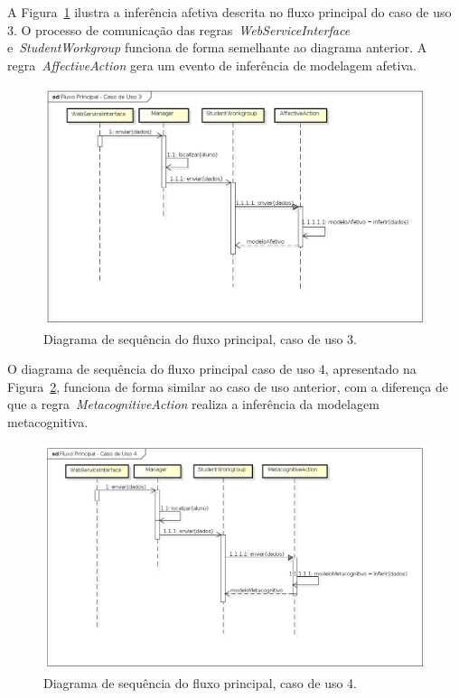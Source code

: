 A Figura~\ref{fig:dss-uc3-fluxo-principal} ilustra a inferência afetiva descrita no fluxo principal do caso de uso 3. O processo de comunicação das regras~\emph{WebServiceInterface} e~\emph{StudentWorkgroup} funciona de forma semelhante ao diagrama anterior. A regra~\emph{AffectiveAction} gera um evento de inferência de modelagem afetiva.

\begin{figure}
	\centering
	\includegraphics[scale=0.48]{images/dss-uc3-fluxo-principal.png}
	\caption{Diagrama de sequência do fluxo principal, caso de uso 3.}
	\label{fig:dss-uc3-fluxo-principal}
\end{figure}

O diagrama de sequência do fluxo principal caso de uso 4, apresentado na Figura~\ref{fig:dss-uc4-fluxo-principal}, funciona de forma similar ao caso de uso anterior, com a diferença de que a regra~\emph{MetacognitiveAction} realiza a inferência da modelagem metacognitiva.

\begin{figure}
	\centering
	\includegraphics[scale=0.48]{images/dss-uc4-fluxo-principal.png}
	\caption{Diagrama de sequência do fluxo principal, caso de uso 4.}
	\label{fig:dss-uc4-fluxo-principal}
\end{figure}

